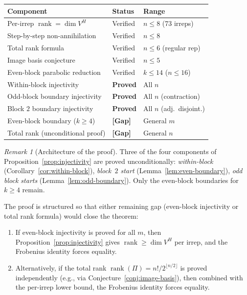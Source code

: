 \documentclass[11pt]{article}
\theoremstyle{definition}
\theoremstyle{remark}
\newtheorem{remark}[theorem]{Remark}
\newcommand{\rk}{\operatorname{rank}}
\begin{document}
\begin{center}
\begin{tabular}{lll}
\toprule
\textbf{Component} & \textbf{Status} & \textbf{Range} \\
\midrule
Per-irrep $\rk = \dim V^H$ & Verified & $n \le 8$ (73 irreps) \\
Step-by-step non-annihilation & Verified & $n \le 8$ \\
Total rank formula & Verified & $n \le 6$ (regular rep) \\
Image basis conjecture & Verified & $n \le 5$ \\
Even-block parabolic reduction & Verified & $k \le 14$ ($n \le 16$) \\
\midrule
Within-block injectivity & \textbf{Proved} & All $n$ \\
Odd-block boundary injectivity & \textbf{Proved} & All $n$ (contraction) \\
Block $2$ boundary injectivity & \textbf{Proved} & All $n$ (adj.\ disjoint.) \\
Even-block boundary ($k \ge 4$) & \textbf{[Gap]} & General $m$ \\
Total rank (unconditional proof) & \textbf{[Gap]} & General $n$ \\
\bottomrule
\end{tabular}
\end{center}

\bigskip

\begin{remark}[Architecture of the proof]
Three of the four components of Proposition~\ref{prop:injectivity}
are proved unconditionally:
\emph{within-block} (Corollary~\ref{cor:within-block}),
\emph{block~$2$ start} (Lemma~\ref{lem:even-boundary}),
\emph{odd block starts} (Lemma~\ref{lem:odd-boundary}).
Only the even-block boundaries for $k \ge 4$ remain.

The proof is structured so that either remaining gap
(even-block injectivity or total rank formula) would close
the theorem:
\begin{enumerate}
\item If even-block injectivity is proved for all $m$, then
  Proposition~\ref{prop:injectivity} gives
  $\rk \ge \dim V^H$ per irrep, and the Frobenius identity
  forces equality.
\item Alternatively, if the total rank
  $\rk(\Pi) = n!/2^{\lfloor n/2\rfloor}$ is proved independently
  (e.g., via Conjecture~\ref{conj:image-basis}), then combined
  with the per-irrep lower bound, the Frobenius identity
  forces equality.
\end{enumerate}
\end{remark}
\end{document}
